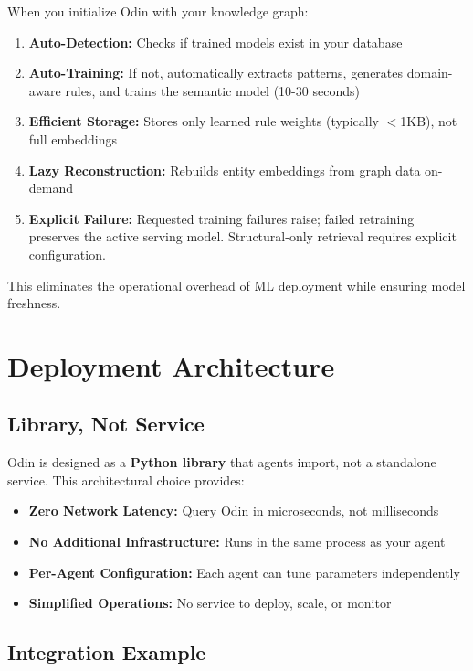 \documentclass[11pt]{article}
\begin{document}
When you initialize Odin with your knowledge graph:
\begin{enumerate}
\item \textbf{Auto-Detection:} Checks if trained models exist in your database
\item \textbf{Auto-Training:} If not, automatically extracts patterns, generates domain-aware rules, and trains the semantic model (10-30 seconds)
\item \textbf{Efficient Storage:} Stores only learned rule weights (typically $<$1KB), not full embeddings
\item \textbf{Lazy Reconstruction:} Rebuilds entity embeddings from graph data on-demand
\item \textbf{Explicit Failure:} Requested training failures raise; failed retraining preserves the active serving model. Structural-only retrieval requires explicit configuration.
\end{enumerate}

This eliminates the operational overhead of ML deployment while ensuring model freshness.

\section{Deployment Architecture}

\subsection{Library, Not Service}

Odin is designed as a \textbf{Python library} that agents import, not a standalone service. This architectural choice provides:

\begin{itemize}
\item \textbf{Zero Network Latency:} Query Odin in microseconds, not milliseconds
\item \textbf{No Additional Infrastructure:} Runs in the same process as your agent
\item \textbf{Per-Agent Configuration:} Each agent can tune parameters independently
\item \textbf{Simplified Operations:} No service to deploy, scale, or monitor
\end{itemize}

\subsection{Integration Example}
\end{document}
